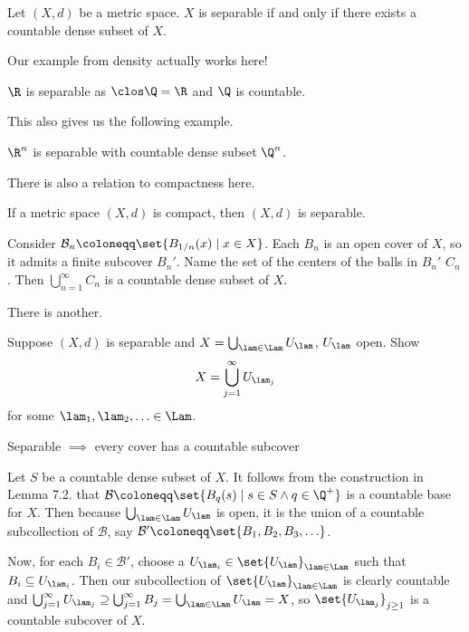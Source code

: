 \documentclass[class=article, crop=false]{standalone}
\begin{document}
\begin{defn}[Separable]
    Let $(X,d)$ be a metric space. $X$ is separable if and only if there exists a countable dense subset of $X$.
\end{defn}

Our example from density actually works here!
\begin{ex}
    $\R$ is separable as $\clos \Q = \R$ and $\Q$ is countable.
\end{ex}

This also gives us the following example.
\begin{ex}
    $\R^n$ is separable with countable dense subset $\Q^n$.
\end{ex}

There is also a relation to compactness here.
\begin{thm}
    If a metric space $(X,d)$ is compact, then $(X,d)$ is separable.
\end{thm}
\begin{pf}
    Consider $\mathcal B_n \coloneqq \set{B_{1/n}(x) \mid x \in X}$. Each $B_n$ is an open cover of $X$, so it admits a finite subcover $B_n'$. Name the set of the centers of the balls in $B_n'$ $C_n$. Then $\bigcup_{n=1}^{\infty} C_n$ is a countable dense subset of $X$.
\end{pf}

There is another.
\begin{thm}
    Suppose $(X,d)$ is separable and $X =  \bigcup_{\lam \in \Lam} U_\lam$, $U_\lam$ open. Show
        \[
            X = \bigcup_{j=1}^\infty U_{\lam_j}
        \]
    for some $\lam_1, \lam_2, \ldots \in \Lam$.
\end{thm}
\begin{slogan}
    Separable $\implies$ every cover has a countable subcover
\end{slogan}
\begin{pf}
    Let $S$ be a countable dense subset of $X$. It follows from the construction in Lemma 7.2. that $\mathcal B \coloneqq \set{B_q(s) \mid s \in S \land q \in \Q^+}$ is a countable base for $X$. Then because $ \bigcup_{\lam \in \Lam}^{} U_{\lam}$ is open, it is the union of a countable subcollection of $\mathcal B$, say $\mathcal B' \coloneqq \set{B_1, B_2, B_3, \ldots}$.

    Now, for each $B_i \in \mathcal B'$, choose a $U_{\lam_i} \in \set{U_\lam}_{\lam \in \Lam}$ such that $B_i \subseteq U_{\lam_i}$. Then our subcollection of $\set{U_\lam}_{\lam \in \Lam}$ is clearly countable and
    $ \bigcup_{j=1}^{\infty} U_{\lam_j} \supseteq \bigcup_{j=1}^{\infty} B_j = \bigcup_{\lam \in \Lam}^{} U_\lam = X$, so $\set{U_{\lam_j}}_{j \geq 1}$ is a countable subcover of $X$.
\end{pf}
\end{document}
